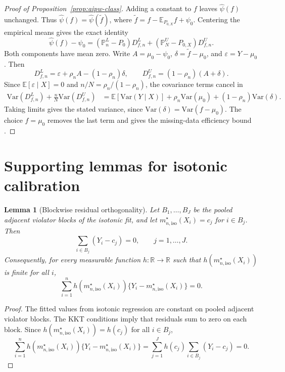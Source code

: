\documentclass{article}
\theoremstyle{plain}
\newtheorem{lemma}{Lemma}
\theoremstyle{definition}
\newcommand{\E}{\mathbb{E}}
\newcommand{\Var}{\mathrm{Var}}
\newcommand{\R}{\mathbb{R}}
\newcommand{\1}{\mathbbm{1}}
\newcommand{\rhon}{\rho_n}
\newcommand{\Pl}{\mathbb{P}^{L}_n}
\newcommand{\Pu}{\mathbb{P}^{U}_N}
\newcommand{\Px}{P_{0,X}}
\begin{document}
\begin{proof}[Proof of Proposition~\ref{prop:aipw-class}]
Adding a constant to \(f\) leaves \(\widehat\psi(f)\) unchanged.
Thus \(\widehat\psi(f)=\widehat\psi(\tilde f)\), where
\(\tilde f=f-\E_{\Px}f+\psi_0\).
Centering the empirical means gives the exact identity
\[
\widehat\psi(f)-\psi_0
=(\Pl-P_0)D_{f,n}^L+(\Pu-\Px)D_{f,n}^U.
\]
Both components have mean zero.
Write \(A=\mu_0-\psi_0\), \(\delta=\tilde f-\mu_0\),
and \(\varepsilon=Y-\mu_0\). Then
\[
D_{f,n}^L=\varepsilon+\rhon A-(1-\rhon)\delta,
\qquad
D_{f,n}^U=(1-\rhon)(A+\delta).
\]
Since \(\E[\varepsilon\mid X]=0\) and
\(n/N=\rhon/(1-\rhon)\), the covariance terms cancel in
\begin{align*}
\Var(D_{f,n}^L)+\frac nN\Var(D_{f,n}^U)
&=\E[\Var(Y\mid X)]+\rhon\Var(\mu_0)
+(1-\rhon)\Var(\delta).
\end{align*}
Taking limits gives the stated variance, since
\(\Var(\delta)=\Var(f-\mu_0)\).
The choice \(f=\mu_0\) removes the last term and gives the
missing-data efficiency bound
\citep{robins1995analysis,robins1995semiparametric,tsiatis2006semiparametric}.
\end{proof}

\section{Supporting lemmas for isotonic calibration}
\label{app:iso-lemmas}

\begin{lemma}[Blockwise residual orthogonality]
\label{lem:block}
Let \(B_1,\dots,B_J\) be the pooled adjacent violator blocks of the isotonic fit, and let \(m_{n,\mathrm{iso}}^\star(X_i)=c_j\) for \(i \in B_j\). Then
\[
\sum_{i \in B_j}(Y_i-c_j)=0,
\qquad j=1,\dots,J.
\]
Consequently, for every measurable function \(h:\R \to \R\) such that \(h(m_{n,\mathrm{iso}}^\star(X_i))\) is finite for all \(i\),
\[
\sum_{i=1}^n h(m_{n,\mathrm{iso}}^\star(X_i))\{Y_i-m_{n,\mathrm{iso}}^\star(X_i)\}=0.
\]
\end{lemma}

\begin{proof}
The fitted values from isotonic regression are constant on pooled adjacent violator blocks. The KKT conditions imply that residuals sum to zero on each block. Since \(h(m_{n,\mathrm{iso}}^\star(X_i))=h(c_j)\) for all \(i \in B_j\),
\[
\sum_{i=1}^n h(m_{n,\mathrm{iso}}^\star(X_i))\{Y_i-m_{n,\mathrm{iso}}^\star(X_i)\}
=
\sum_{j=1}^J h(c_j)\sum_{i \in B_j}(Y_i-c_j)
=
0.
\]
\end{proof}
\end{document}
